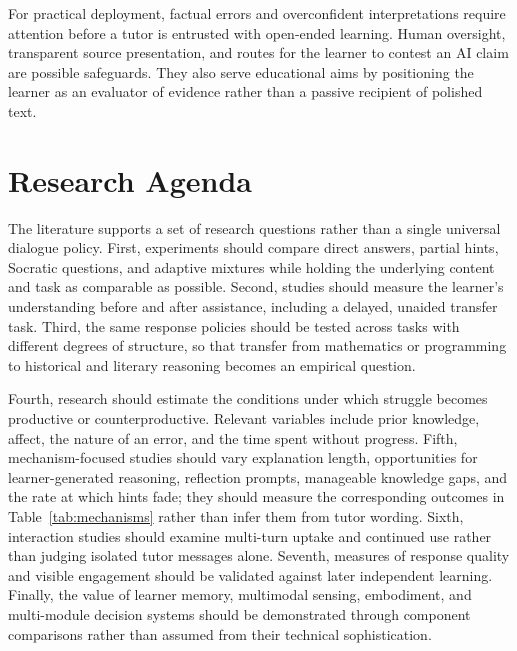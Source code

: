 \documentclass[11pt,a4paper]{article}
\begin{document}
For practical deployment, factual errors and overconfident interpretations require attention before a tutor is entrusted with open-ended learning. Human oversight, transparent source presentation, and routes for the learner to contest an AI claim are possible safeguards. They also serve educational aims by positioning the learner as an evaluator of evidence rather than a passive recipient of polished text.

\section{Research Agenda}
The literature supports a set of research questions rather than a single universal dialogue policy. First, experiments should compare direct answers, partial hints, Socratic questions, and adaptive mixtures while holding the underlying content and task as comparable as possible. Second, studies should measure the learner's understanding before and after assistance, including a delayed, unaided transfer task. Third, the same response policies should be tested across tasks with different degrees of structure, so that transfer from mathematics or programming to historical and literary reasoning becomes an empirical question.

Fourth, research should estimate the conditions under which struggle becomes productive or counterproductive. Relevant variables include prior knowledge, affect, the nature of an error, and the time spent without progress. Fifth, mechanism-focused studies should vary explanation length, opportunities for learner-generated reasoning, reflection prompts, manageable knowledge gaps, and the rate at which hints fade; they should measure the corresponding outcomes in Table~\ref{tab:mechanisms} rather than infer them from tutor wording. Sixth, interaction studies should examine multi-turn uptake and continued use rather than judging isolated tutor messages alone. Seventh, measures of response quality and visible engagement should be validated against later independent learning. Finally, the value of learner memory, multimodal sensing, embodiment, and multi-module decision systems should be demonstrated through component comparisons rather than assumed from their technical sophistication.
\end{document}
